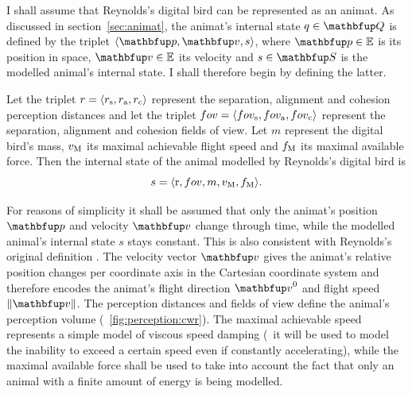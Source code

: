 I shall assume that Reynolds's digital bird can be represented as an animat. As discussed in section~\ref{sec:animat}, the animat's internal state $q \in \set{Q}$ is defined by the triplet $\langle\vect{p},\vect{v},s\rangle$, where $\vect{p} \in \E$ is its position in space, $\vect{v} \in \E$ its velocity and $s \in \set{S}$ is the modelled animal's internal state. I shall therefore begin by defining the latter. 

\begin{definition}
\label{def:animat:s:cwr}
Let the triplet $r=\langle r_\textnormal{s}, r_\textnormal{a}, r_\textnormal{c}\rangle$ represent the separation, alignment and cohesion perception distances and let the triplet $fov=\langle fov_\textnormal{s}, fov_\textnormal{a}, fov_\textnormal{c}\rangle$ represent the separation, alignment and cohesion fields of view. Let $m$ represent the digital bird's mass, $v_\textnormal{M}$ its maximal achievable flight speed and $f_\textnormal{M}$ its maximal available force. Then the internal state of the animal modelled by Reynolds's digital bird is 
\begin{equation}
s=\langle \mathrm{r}, fov, m, v_\textnormal{M}, f_\textnormal{M} \rangle.
\end{equation}
\end{definition}
%
\indent For reasons of simplicity it shall be assumed that only the animat's position $\vect{p}$ and velocity $\vect{v}$ change through time, while the modelled animal's internal state $s$ stays constant. This is also consistent with Reynolds's original definition \cite{reynolds:1987}. The velocity vector $\vect{v}$ gives the animat's relative position changes per coordinate axis in the Cartesian coordinate system and therefore encodes the animat's flight direction $\vect{v}^0$ and flight speed $\left\|\vect{v}\right\|$. The perception distances and fields of view define the animal's perception volume (\fig~\ref{fig:perception:cwr}). The maximal achievable speed represents a simple model of viscous speed damping (\ie\ it will be used to model the inability to exceed a certain speed even if constantly accelerating), while the maximal available force shall be used to take into account the fact that only an animal with a finite amount of energy is being modelled.

